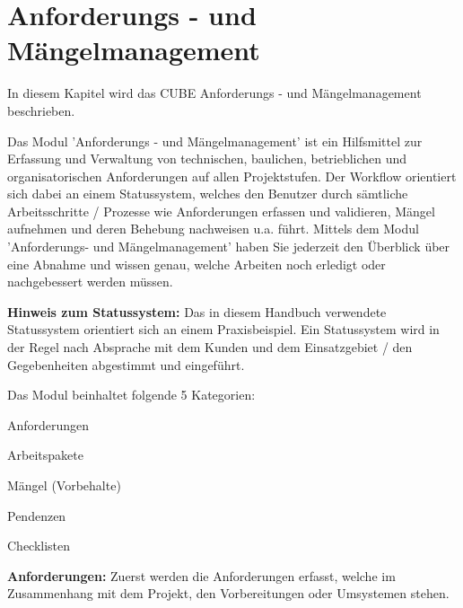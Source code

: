 
\clearpage

\section{Anforderungs - und Mängelmanagement}
\label{bkm:Ref2018071701}

In diesem Kapitel wird das CUBE Anforderungs - und Mängelmanagement beschrieben.

\vspace{\baselineskip}

Das Modul 'Anforderungs - und Mängelmanagement' ist ein Hilfsmittel zur Erfassung und Verwaltung von technischen, baulichen, betrieblichen und organisatorischen Anforderungen auf allen Projektstufen. Der Workflow orientiert sich dabei an einem Statussystem, welches den Benutzer durch sämtliche Arbeitsschritte / Prozesse wie Anforderungen erfassen und validieren, Mängel aufnehmen und deren Behebung nachweisen u.a. führt. Mittels dem Modul 'Anforderungs- und Mängelmanagement' haben Sie jederzeit den Überblick über eine Abnahme und wissen genau, welche Arbeiten noch erledigt oder nachgebessert werden müssen.

\vspace{\baselineskip}

\textbf{Hinweis zum Statussystem:} Das in diesem Handbuch verwendete Statussystem orientiert sich an einem Praxisbeispiel. Ein Statussystem wird in der Regel nach Absprache mit dem Kunden und dem Einsatzgebiet / den Gegebenheiten abgestimmt und eingeführt.

\vspace{\baselineskip}

Das Modul beinhaltet folgende 5 Kategorien:

\vspace{\baselineskip}

\begin{compactitem}
	\item Anforderungen
	\item Arbeitspakete
	\item Mängel (Vorbehalte)
	\item Pendenzen
	\item Checklisten
\end{compactitem}

\vspace{\baselineskip}

\textbf{Anforderungen:} Zuerst werden die Anforderungen erfasst, welche im Zusammenhang mit dem Projekt, den Vorbereitungen oder Umsystemen stehen. \\

